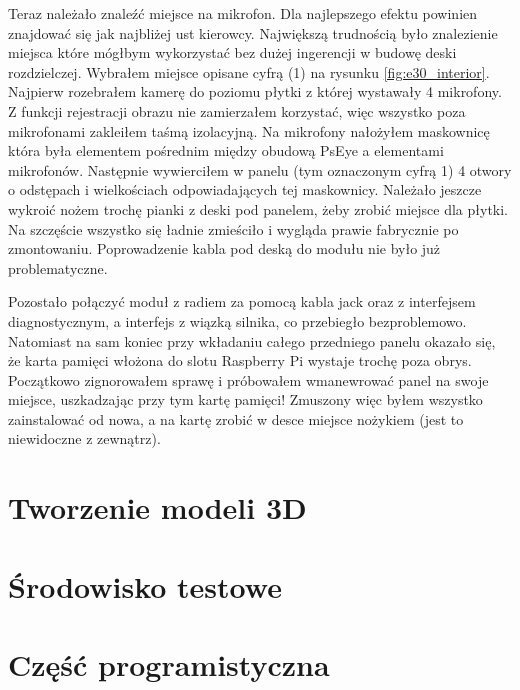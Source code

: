 \documentclass[declaration,shortabstract, inz]{iithesis}
\begin{document}
    Teraz należało znaleźć miejsce na mikrofon. Dla najlepszego efektu powinien znajdować się jak najbliżej ust kierowcy. Największą trudnością było znalezienie miejsca które mógłbym wykorzystać bez dużej ingerencji w budowę deski rozdzielczej. Wybrałem miejsce opisane cyfrą (1) na rysunku \ref{fig:e30_interior}. Najpierw rozebrałem kamerę do poziomu płytki z której wystawały 4 mikrofony. Z funkcji rejestracji obrazu nie zamierzałem korzystać, więc wszystko poza mikrofonami zakleiłem taśmą izolacyjną. Na mikrofony nałożyłem maskownicę która była elementem pośrednim między obudową PsEye a elementami mikrofonów. Następnie wywierciłem w panelu (tym oznaczonym cyfrą 1) 4 otwory o odstępach i wielkościach odpowiadających tej maskownicy. Należało jeszcze wykroić nożem trochę pianki z deski pod panelem, żeby zrobić miejsce dla płytki. Na szczęście wszystko się ładnie zmieściło i wygląda prawie fabrycznie po zmontowaniu. Poprowadzenie kabla pod deską do modułu nie było już problematyczne.
    
    Pozostało połączyć moduł z radiem za pomocą kabla jack oraz z interfejsem diagnostycznym, a interfejs z wiązką silnika, co przebiegło bezproblemowo. Natomiast na sam koniec przy wkładaniu całego przedniego panelu okazało się, że karta pamięci włożona do slotu Raspberry Pi wystaje trochę poza obrys. Początkowo zignorowałem sprawę i próbowałem wmanewrować panel na swoje miejsce, uszkadzając przy tym kartę pamięci! Zmuszony więc byłem wszystko zainstalować od nowa, a na kartę zrobić w desce miejsce nożykiem (jest to niewidoczne z zewnątrz).
\section{Tworzenie modeli 3D}
\label{section:3d}
\section{Środowisko testowe} %
\section{Część programistyczna}


\end{document}
